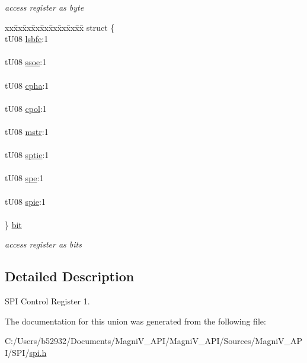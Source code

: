 \begin{DoxyCompactItemize}
\begin{DoxyCompactList}\small\item\em access register as byte \end{DoxyCompactList}\item 
\hypertarget{unionu_s_p_i_c_r1_a0133d88f37092972cf9b0b3b160c0f43}{}\begin{tabbing}
xx\=xx\=xx\=xx\=xx\=xx\=xx\=xx\=xx\=\kill
struct \{\\
\>tU08 \hyperlink{unionu_s_p_i_c_r1_abb6a9aaaf65525332f3cf679f42a8d8d}{lsbfe}:1\\
\>\\
\>tU08 \hyperlink{unionu_s_p_i_c_r1_a920c9cad4b28df0c9edc9a408009845f}{ssoe}:1\\
\>\\
\>tU08 \hyperlink{unionu_s_p_i_c_r1_a92ef9b1003a7ecaab1013b7fc8c993c0}{cpha}:1\\
\>\\
\>tU08 \hyperlink{unionu_s_p_i_c_r1_adafcb4dbe0b7c2367e3bf9de82c4efa2}{cpol}:1\\
\>\\
\>tU08 \hyperlink{unionu_s_p_i_c_r1_add61a279b555ebc188756c40a12f8642}{mstr}:1\\
\>\\
\>tU08 \hyperlink{unionu_s_p_i_c_r1_a9799d2970034cbf4ad8befabfaa3ec2a}{sptie}:1\\
\>\\
\>tU08 \hyperlink{unionu_s_p_i_c_r1_ae9507cad2df89b07a6359bf0032e0004}{spe}:1\\
\>\\
\>tU08 \hyperlink{unionu_s_p_i_c_r1_ab8ae24a61496bd3301de2ff1e70a7ca3}{spie}:1\\
\>\\
\} \hyperlink{unionu_s_p_i_c_r1_a0133d88f37092972cf9b0b3b160c0f43}{bit}\label{unionu_s_p_i_c_r1_a0133d88f37092972cf9b0b3b160c0f43}
\\

\end{tabbing}\begin{DoxyCompactList}\small\item\em access register as bits \end{DoxyCompactList}\end{DoxyCompactItemize}


\subsection{Detailed Description}
S\+P\+I Control Register 1. 

The documentation for this union was generated from the following file\+:\begin{DoxyCompactItemize}
\item 
C\+:/\+Users/b52932/\+Documents/\+Magni\+V\+\_\+\+A\+P\+I/\+Magni\+V\+\_\+\+A\+P\+I/\+Sources/\+Magni\+V\+\_\+\+A\+P\+I/\+S\+P\+I/\hyperlink{spi_8h}{spi.\+h}\end{DoxyCompactItemize}
